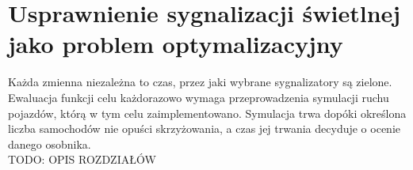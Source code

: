 \section*{Usprawnienie sygnalizacji świetlnej jako problem optymalizacyjny}
Każda zmienna niezależna to czas, przez jaki wybrane sygnalizatory są zielone. Ewaluacja funkcji celu każdorazowo wymaga przeprowadzenia symulacji ruchu pojazdów, którą w tym celu zaimplementowano. Symulacja trwa dopóki określona liczba samochodów nie opuści skrzyżowania, a czas jej trwania decyduje o ocenie danego osobnika. \\
{\Huge TODO: OPIS ROZDZIAŁÓW}
